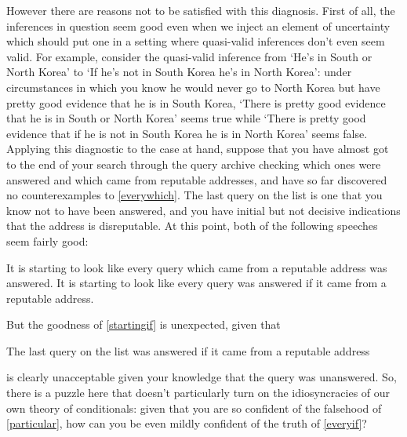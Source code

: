 \documentclass[If.tex]{subfiles}
\begin{document}
However there are reasons not to be satisfied with this diagnosis.  First of all, the inferences in question seem good even when we inject an element of uncertainty which should put one in a setting where quasi-valid inferences don't even seem valid.  For example, consider the quasi-valid inference from ‘He's in South or North Korea’ to ‘If he's not in South Korea he's in North Korea’: under circumstances in which you know he would never go to North Korea but have pretty good evidence that he is in South Korea, ‘There is pretty good evidence that he is in South or North Korea’ seems true
while ‘There is pretty good evidence that if he is not in South Korea he is in North Korea’ seems false.  Applying this diagnostic to the case at hand, suppose that you have almost got to the end of your search through the query archive checking which ones were answered and which came from reputable addresses, and have so far discovered no counterexamples to \ref{everywhich}.  The last query on the list is one that you know not to have been answered, and you have initial but not decisive indications that the address is disreputable.  At this point, both of the following speeches seem fairly good:
\begin{prop}
	\nitem \label{startingwhich}
	It is starting to look like every query which came from a reputable address was answered.
	\nitem \label{startingif}
	It is starting to look like every query was answered if it came from a reputable address.
\end{prop}
But the goodness of \ref{startingif} is unexpected, given that 
\begin{prop}
	\nitem \label{particular}
	The last query on the list was answered if it came from a reputable address
\end{prop}
is clearly unacceptable given your knowledge that the query was unanswered.  So, there is a puzzle here that doesn't particularly turn on the idiosyncracies of our own theory of conditionals: given that you are so confident of the falsehood of \ref{particular}, how can you be even mildly confident of the truth of \ref{everyif}?  
\end{document}
